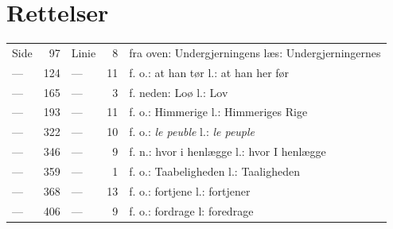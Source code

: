 \documentclass[12pt,a4paper]{book}
\begin{document}
\chapter*{Rettelser}
\label{ch:rettelser}

\begingroup
\setlength{\parindent}{0pt}
\begin{tabular}{@{}l@{~}r@{~~}l@{~}r@{~~}l@{}}
Side & 97  & Linie & 8  & fra oven: Undergjerningens læs: Undergjerningernes\\
---  & 124 & ---   & 11 & f. o.: at han tør l.: at han her før\\
---  & 165 & ---   & 3  & f. neden: Loø l.: Lov\\
---  & 193 & ---   & 11 & f. o.: Himmerige l.: Himmeriges Rige\\
---  & 322 & ---   & 10 & f. o.: \textit{le peuble} l.: \textit{le peuple}\\
---  & 346 & ---   & 9  & f. n.: hvor i henlægge l.: hvor I henlægge\\
---  & 359 & ---   & 1  & f. o.: Taabeligheden l.: Taaligheden\\
---  & 368 & ---   & 13 & f. o.: fortjene l.: fortjener\\
---  & 406 & ---   & 9  & f. o.: fordrage l: foredrage\\
\end{tabular}
\endgroup
\end{document}
